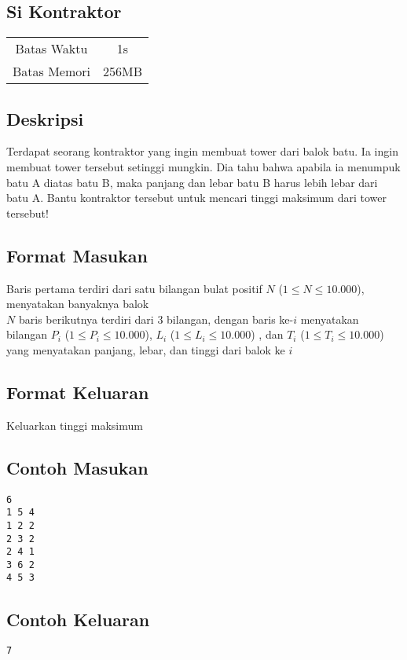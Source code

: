 \documentclass{article}
\begin{document}
\begin{center}

    
    \section*{Si Kontraktor} %

    \begin{tabular}{ | c c | }
        \hline
        Batas Waktu  & 1s \\    %
        Batas Memori & 256MB \\  %
        \hline
    \end{tabular}
\end{center}

\subsection*{Deskripsi}
Terdapat seorang kontraktor yang ingin membuat tower dari balok batu. Ia ingin membuat tower tersebut setinggi mungkin. Dia tahu bahwa apabila ia menumpuk batu A diatas batu B, maka panjang dan lebar batu B harus lebih lebar dari batu A. Bantu kontraktor tersebut untuk mencari tinggi maksimum dari tower tersebut!


\subsection*{Format Masukan}

Baris pertama terdiri dari satu bilangan bulat positif $N$ ($1 \leq N \leq 10.000$), menyatakan banyaknya balok\\
$N$ baris berikutnya terdiri dari 3 bilangan, dengan baris ke-$i$ menyatakan bilangan $P_i$ ($1 \leq P_i \leq 10.000$), $L_i$ ($1 \leq L_i \leq 10.000$) , dan $T_i$ ($1 \leq T_i \leq 10.000$) yang menyatakan panjang, lebar, dan tinggi dari balok ke $i$ \\

\subsection*{Format Keluaran}

Keluarkan tinggi maksimum
\\

\begin{multicols}{2}
\subsection*{Contoh Masukan}
\begin{lstlisting}
6
1 5 4
1 2 2
2 3 2
2 4 1
3 6 2
4 5 3
\end{lstlisting}
\columnbreak
\subsection*{Contoh Keluaran}
\begin{lstlisting}
7
\end{lstlisting}
\vfill
\null
\end{multicols}
\end{document}
